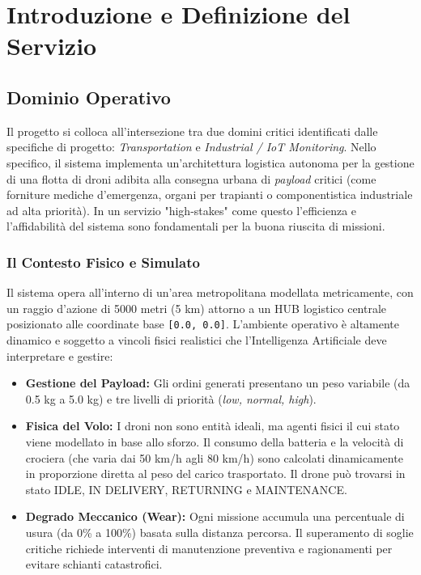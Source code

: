 
\chapter{Introduzione e Definizione del Servizio}
\label{cap:introduzione_definizione}

\section{Dominio Operativo}
\label{sec:dominio_operativo}

Il progetto si colloca all'intersezione tra due domini critici identificati dalle specifiche di progetto: \textit{Transportation} e \textit{Industrial / IoT Monitoring}. %
Nello specifico, il sistema implementa un'architettura logistica autonoma per la gestione di una flotta di droni adibita alla consegna urbana di \textit{payload} critici (come forniture mediche d'emergenza, organi per trapianti o componentistica industriale ad alta priorità). %
In un servizio "high-stakes" come questo l'efficienza e l'affidabilità del sistema sono fondamentali per la buona riuscita di missioni. %

\subsection*{Il Contesto Fisico e Simulato}

Il sistema opera all'interno di un'area metropolitana modellata metricamente, con un raggio d'azione di 5000 metri (5 km) attorno a un HUB logistico centrale posizionato alle coordinate base \texttt{[0.0, 0.0]}. %
L'ambiente operativo è altamente dinamico e soggetto a vincoli fisici realistici che l'Intelligenza Artificiale deve interpretare e gestire: %

\begin{itemize}
    \item \textbf{Gestione del Payload:} Gli ordini generati presentano un peso variabile (da 0.5 kg a 5.0 kg) e tre livelli di priorità (\textit{low, normal, high}). %
    \item \textbf{Fisica del Volo:} I droni non sono entità ideali, ma agenti fisici il cui stato viene modellato in base allo sforzo. %
    Il consumo della batteria e la velocità di crociera (che varia dai 50 km/h agli 80 km/h) sono calcolati dinamicamente in proporzione diretta al peso del carico trasportato. %
    Il drone può trovarsi in stato IDLE, IN DELIVERY, RETURNING e MAINTENANCE. %
    \item \textbf{Degrado Meccanico (Wear):} Ogni missione accumula una percentuale di usura (da 0\% a 100\%) basata sulla distanza percorsa. %
    Il superamento di soglie critiche richiede interventi di manutenzione preventiva e ragionamenti per evitare schianti catastrofici. %
\end{itemize}

